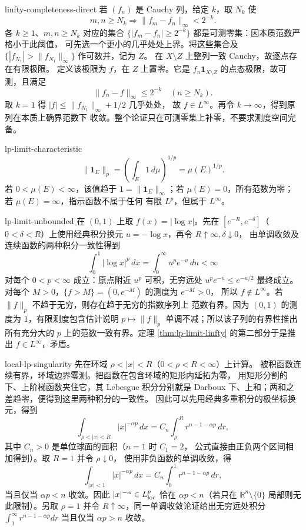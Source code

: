 \begin{solution}{linfty-completeness-direct}
若 \((f_n)\) 是 Cauchy 列，给定 \(k\)，取 \(N_k\) 使
\[
 m,n\ge N_k\Longrightarrow
 \|f_m-f_n\|_\infty<2^{-k}.
\]
各 \(k\ge1\)、\(m,n\ge N_k\) 对应的集合
\(\{|f_m-f_n|\ge2^{-k}\}\) 都是可测零集：因本质范数严格小于此阈值，
可先选一个更小的几乎处处上界。将这些集合及
\(\{|f_{N_1}|>\|f_{N_1}\|_\infty\}\) 作可数并，记为 \(Z\)。
在 \(X\setminus Z\) 上整列一致 Cauchy，故逐点存在有限极限。
定义该极限为 \(f\)，在 \(Z\) 上置零。它是
\(f_n\mathbf1_{X\setminus Z}\) 的点态极限，故可测，且满足
\[
 \|f_n-f\|_\infty\le2^{-k}\quad(n\ge N_k).
\]
取 \(k=1\) 得 \(|f|\le\|f_{N_1}\|_\infty+1/2\) 几乎处处，
故 \(f\in L^\infty\)。再令 \(k\to\infty\)，得到原列在本质上确界范数下
收敛。整个论证只在可测零集上补零，不要求测度空间完备。
\end{solution}

\begin{solution}{lp-limit-characteristic}
\[
 \|\mathbf1_E\|_p
 =\left(\int_E1\,d\mu\right)^{1/p}
 =\mu(E)^{1/p}.
\]
若 \(0<\mu(E)<\infty\)，该值趋于 \(1=\|\mathbf1_E\|_\infty\)；若
\(\mu(E)=0\)，所有范数为零；若 \(\mu(E)=\infty\)，指示函数不属于任何
有限 \(L^p\)，但属于 \(L^\infty\)。
\end{solution}

\begin{solution}{lp-limit-unbounded}
在 \((0,1)\) 上取 \(f(x)=|\log x|\)。先在
\([e^{-R},e^{-\delta}]\)（\(0<\delta<R\)）上使用经典积分换元
\(u=-\log x\)，再令 \(R\uparrow\infty,\delta\downarrow0\)，
由单调收敛及连续函数的两种积分一致性得到
\[
 \int_0^1|\log x|^p\,dx=\int_0^\infty u^pe^{-u}\,du<\infty
\]
对每个 \(0<p<\infty\) 成立：原点附近 \(u^p\) 可积，无穷远处
\(u^pe^{-u}\le e^{-u/2}\) 最终成立。
对每个 \(M>0\)，\(\{f>M\}=(0,e^{-M})\) 的测度为 \(e^{-M}>0\)，
所以 \(f\notin L^\infty\)。若 \(\|f\|_p\) 不趋于无穷，则存在趋于无穷的指数序列上
范数有界。因为 \((0,1)\) 的测度为 \(1\)，有限测度包含估计说明
\(p\mapsto\|f\|_p\) 单调不减；所以该子列的有界性推出所有充分大的 \(p\)
上的范数一致有界。定理 \ref{thm:lp-limit-linfty} 的第二部分于是推出
\(f\in L^\infty\)，矛盾。
\end{solution}

\begin{solution}{local-lp-singularity}
先在环域 \(\rho<|x|<R\)（\(0<\rho<R<\infty\)）上计算。
被积函数连续有界，环域边界零测。把函数在包含环域的矩形内延拓为零，
用矩形分割的下、上阶梯函数夹住它，其 Lebesgue 积分分别就是 Darboux
下、上和；两和之差趋零，便得到这里两种积分的一致性。
因此可以先用经典多重积分的极坐标换元，得到
\[
 \int_{\rho<|x|<R}|x|^{-\alpha p}\,dx
 =C_n\int_\rho^R r^{n-1-\alpha p}\,dr,
\]
其中 \(C_n>0\) 是单位球面的面积（\(n=1\) 时 \(C_1=2\)，
公式直接由正负两个区间相加得到）。取 \(R=1\) 并令 \(\rho\downarrow0\)，
使用非负函数的单调收敛，得
\[
 \int_{|x|<1}|x|^{-\alpha p}\,dx
 =C_n\int_0^1r^{n-1-\alpha p}\,dr,
\]
当且仅当 \(\alpha p<n\) 收敛。因此
\(|x|^{-\alpha}\in L^p_{\rm loc}\) 恰在 \(\alpha p<n\)（若只在
\(\mathbb R^n\setminus\{0\}\) 局部则无此限制）。另取 \(\rho=1\) 并令
\(R\uparrow\infty\)，同一单调收敛论证给出无穷远处积分
\(\int_1^\infty r^{n-1-\alpha p}dr\) 当且仅当 \(\alpha p>n\) 收敛。
\end{solution}

